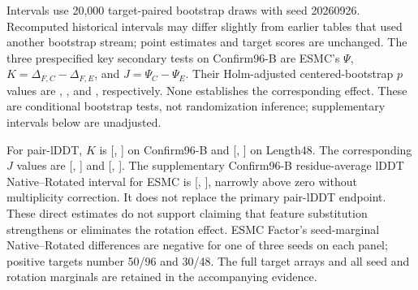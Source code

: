 Intervals use 20,000 target-paired bootstrap draws with seed 20260926.
Recomputed historical intervals may differ slightly from earlier tables that
used another bootstrap stream; point estimates and target scores are unchanged.
The three prespecified key secondary tests on Confirm96-B are ESMC's $\Psi$,
$K=\Delta_{F,C}-\Delta_{F,E}$, and $J=\Psi_C-\Psi_E$. Their Holm-adjusted
centered-bootstrap $p$ values are ,
, and , respectively. None establishes the
corresponding effect. These are conditional bootstrap tests, not randomization
inference; supplementary intervals below are unadjusted.

For pair-lDDT, $K$ is 
[, ] on
Confirm96-B and 
[, ] on
Length48. The corresponding $J$ values are 
[, ] and
[, ].
The supplementary Confirm96-B residue-average lDDT Native--Rotated interval
for ESMC is [,
], narrowly above zero
without multiplicity correction. It does not replace the primary pair-lDDT
endpoint. These direct estimates do not support claiming that feature substitution
strengthens or eliminates the rotation effect. ESMC Factor's seed-marginal
Native--Rotated differences are negative for one of three seeds on each panel;
positive targets number 50/96 and 30/48. The full target arrays and all seed
and rotation marginals are retained in the accompanying evidence.

